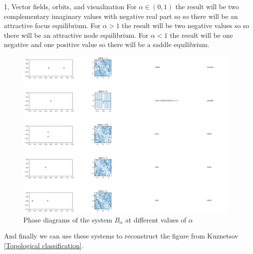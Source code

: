 \begin{task}{1, Vector fields, orbits, and visualization}
For $\alpha \in (0,1)$ the result will be two complementary imaginary values with negative real part so so there will be an attractive focus equilibrium.
For $\alpha > 1$ the result will be two negative values so so there will be an attractive node equilibrium.
For $\alpha < 1$ the result will be one negative and one positive value so there will be a saddle equilibrium.


\begin{figure}[H]
    \centering
    \includegraphics[width=1\textwidth]{images/bfdlinear2.png}
    \caption{Phase diagrams of the system $B_\alpha$ at different values of $\alpha$}
    \label{fig:bfdlinear2}
\end{figure}

And finally we can use these systems to reconstruct the figure from Kuznetsov \ref{Topological classification}.


\end{task}
